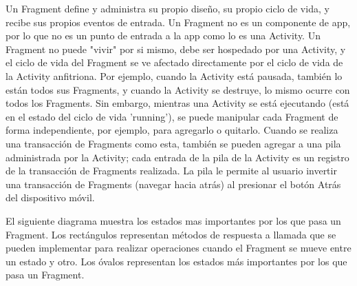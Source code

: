 Un Fragment define y administra su propio diseño, su propio ciclo de vida, y recibe sus propios eventos de entrada. Un Fragment no es un componente de app, por lo que no es un punto de entrada a la app como lo es una Activity. Un Fragment no puede "vivir" por si mismo, debe ser hospedado por una Activity, y el ciclo de vida del Fragment se ve afectado directamente por el ciclo de vida de la Activity anfitriona. Por ejemplo, cuando la Activity está pausada, también lo están todos sus Fragments, y cuando la Activity se destruye, lo mismo ocurre con todos los Fragments. Sin embargo, mientras una Activity se está ejecutando (está en el estado del ciclo de vida 'running'), se puede manipular cada Fragment de forma independiente, por ejemplo, para agregarlo o quitarlo. Cuando se realiza una transacción de Fragments como esta, también se pueden agregar a una pila administrada por la Activity; cada entrada de la pila de la Activity es un registro de la transacción de Fragments realizada. La pila le permite al usuario invertir una transacción de Fragments (navegar hacia atrás) al presionar el botón Atrás del dispositivo móvil.

El siguiente diagrama muestra los estados mas importantes por los que pasa un Fragment. Los rectángulos representan métodos de respuesta a llamada que se pueden implementar para realizar operaciones cuando el Fragment se mueve entre un estado y otro. Los óvalos representan los estados más importantes por los que pasa un Fragment.



